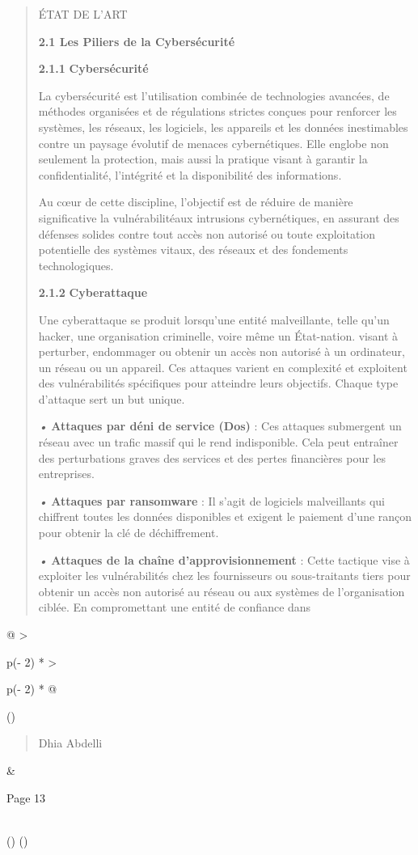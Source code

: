\documentclass[
]{article}
\begin{document}
\begin{quote}
ÉTAT DE L'ART

\textbf{2.1 Les Piliers de la Cybersécurité}

\textbf{2.1.1} \textbf{Cybersécurité}

La cybersécurité est l'utilisation combinée de technologies avancées, de
méthodes organisées et de régulations strictes conçues pour renforcer
les systèmes, les réseaux, les logiciels, les appareils et les données
inestimables contre un paysage évolutif de menaces cybernétiques. Elle
englobe non seulement la protection, mais aussi la pratique visant à
garantir la confidentialité, l'intégrité et la disponibilité des
informations.

Au cœur de cette discipline, l'objectif est de réduire de manière
significative la vulnérabilitéaux intrusions cybernétiques, en assurant
des défenses solides contre tout accès non autorisé ou toute
exploitation potentielle des systèmes vitaux, des réseaux et des
fondements technologiques.

\textbf{2.1.2} \textbf{Cyberattaque}

Une cyberattaque se produit lorsqu'une entité malveillante, telle qu'un
hacker, une organisation criminelle, voire même un État-nation. visant à
perturber, endommager ou obtenir un accès non autorisé à un ordinateur,
un réseau ou un appareil. Ces attaques varient en complexité et
exploitent des vulnérabilités spécifiques pour atteindre leurs
objectifs. Chaque type d'attaque sert un but unique.

\emph{•} \textbf{Attaques par déni de service (Dos)} : Ces attaques
submergent un réseau avec un trafic massif qui le rend indisponible.
Cela peut entraîner des perturbations graves des services et des pertes
financières pour les entreprises.

\emph{•} \textbf{Attaques par ransomware} : Il s'agit de logiciels
malveillants qui chiffrent toutes les données disponibles et exigent le
paiement d'une rançon pour obtenir la clé de déchiffrement.

\emph{•} \textbf{Attaques de la chaîne d'approvisionnement} : Cette
tactique vise à exploiter les vulnérabilités chez les fournisseurs ou
sous-traitants tiers pour obtenir un accès non autorisé au réseau ou aux
systèmes de l'organisation ciblée. En compromettant une entité de
confiance dans
\end{quote}

\begin{longtable}[]{@{}
  >{\raggedright\arraybackslash}p{(\columnwidth - 2\tabcolsep) * }
  >{\raggedright\arraybackslash}p{(\columnwidth - 2\tabcolsep) * }@{}}
\toprule()
\begin{minipage}[b]{\linewidth}\raggedright
\begin{quote}
Dhia Abdelli
\end{quote}
\end{minipage} & \begin{minipage}[b]{\linewidth}\raggedright
Page 13
\end{minipage} \\
\midrule()
\endhead
\bottomrule()
\end{longtable}
\end{document}
